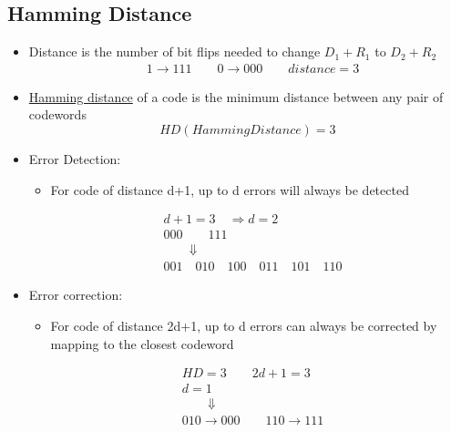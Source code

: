 \documentclass[12pt]{ctexart}   %
\begin{document}
	\subsection{Hamming Distance}
	\begin{itemize}
		\item Distance is the number of bit flips needed to change $D_1 + R_1$ to $D_2 + R_2$
		\begin{equation}
		\begin{aligned}
		& 1 \rightarrow 111  \qquad 0 \rightarrow 000  \qquad distance = 3
		\end{aligned}
		\end{equation}
		
		\item \underline{Hamming distance} of a code is the minimum distance between any pair of codewords
		$$
		HD(Hamming Distance) = 3
		$$
		
		\item Error Detection:
		\begin{itemize}
			\item For code of distance d+1, up to d errors will always be detected
		\end{itemize}
		\begin{equation}
		\begin{aligned}
		& d+1 =3 \quad  \Rightarrow d =2 \\
		& 000 \qquad 111 \\
		& \qquad \Downarrow \\
		& 001 \quad 010 \quad 100 \quad 011 \quad 101 \quad 110
		\end{aligned}
		\end{equation}
		
		\item Error correction:
		\begin{itemize}
			\item For code of distance 2d+1, up to d errors can always be corrected by mapping to the closest codeword
		\end{itemize}
		
		\begin{equation}
		\begin{aligned}
		& HD = 3   \qquad   2d+1 = 3 \\
		& d =1 \\
		&  \qquad \Downarrow \\
		&  010 \rightarrow 000 \qquad 110 \rightarrow 111
		\end{aligned}
		\end{equation}
		
	\end{itemize}
	
\end{document}
